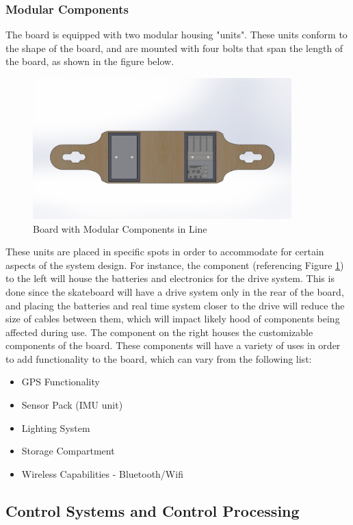 \documentclass[titlepage, letterpaper,12pt]{article}
\begin{document}
\subsubsection{Modular Components}
The board is equipped with two modular housing "units". These units conform to the shape of the board, and are mounted with four bolts that span the length of the board, as shown in the figure below.

\begin{figure}
    \centering
    \includegraphics[width=10cm]{figs/ModularAssembledBottom.JPG}
    \caption{Board with Modular Components in Line}
    \label{inline}
\end{figure}

These units are placed in specific spots in order to accommodate for certain aspects of the system design. For instance, the component (referencing Figure \ref{inline}) to the left will house the batteries and electronics for the drive system. This is done since the skateboard will have a drive system only in the rear of the board, and placing the batteries and real time system closer to the drive will reduce the size of cables between them, which will impact likely hood of components being affected during use. The component on the right houses the customizable components of the board. These components will have a variety of uses in order to add functionality to the board, which can vary from the following list:

\begin{itemize}
    \item GPS Functionality
    \item Sensor Pack (IMU unit)
    \item Lighting System
    \item Storage Compartment
    \item Wireless Capabilities - Bluetooth/Wifi
\end{itemize}

\subsection{Control Systems and Control Processing}
\end{document}
